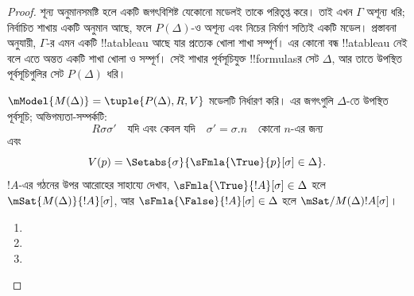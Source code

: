 \documentclass[../../../include/open-logic-section]{subfiles}
\begin{document}
\begin{proof}
শূন্য অনুমানসমষ্টি হলে একটি জগৎবিশিষ্ট যেকোনো মডেলই তাকে পরিতৃপ্ত করে। তাই এখন $\Gamma$ অশূন্য ধরি; নির্বাচিত শাখায় একটি অনুমান আছে, ফলে $P(\Delta)$-ও অশূন্য এবং নিচের নির্মাণ সত্যিই একটি মডেল।
প্রস্তাবনা অনুযায়ী, $\Gamma$-র এমন একটি !!a{tableau} আছে যার
প্রত্যেক খোলা শাখা সম্পূর্ণ। এর কোনো বন্ধ !!a{tableau}
নেই বলে এতে অন্তত একটি শাখা খোলা ও সম্পূর্ণ।
সেই শাখার পূর্বসূচিযুক্ত !!{formula}sর সেট $\Delta$,
আর তাতে উপস্থিত পূর্বসূচিগুলির সেট $P(\Delta)$ ধরি।

$\mModel{M(\Delta)} = \tuple{P(\Delta), R, V}$ মডেলটি
নির্ধারণ করি। এর জগৎগুলি $\Delta$-তে উপস্থিত পূর্বসূচি;
অভিগম্যতা-সম্পর্কটি:
\[
R\sigma\sigma' \quad \text{যদি এবং কেবল যদি} \quad
\sigma'=\sigma.n \quad \text{কোনো~$n$-এর জন্য}
\]
এবং
\[
V(p) = \Setabs{\sigma}{\sFmla{\True}{p}[\sigma] \in \Delta}.
\]
$!A$-এর গঠনের উপর আরোহের সাহায্যে দেখাব,
$\sFmla{\True}{!A}[\sigma] \in \Delta$ হলে
$\mSat{M(\Delta)}{!A}[\sigma]$, আর
$\sFmla{\False}{!A}[\sigma] \in \Delta$ হলে
$\mSat/{M(\Delta)}{!A}[\sigma]$।

\begin{enumerate}
  \item {}
  \item {}
  \item {}
\end{enumerate}
\end{proof}
\end{document}
